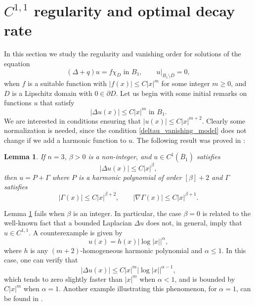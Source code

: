 \documentclass[11pt,a4paper]{amsart}
\newtheorem{Lemma}[Theorem]{Lemma}
\theoremstyle{definition}
\numberwithin{equation}{section}
\newcommand{\abs}[1]{\lvert #1 \rvert}          %
\newcommand{\ol}[1]{\overline{#1}}
\newcommand{\p}{\partial}
\begin{document}
\section{$C^{1,1}$ regularity and optimal decay rate} \label{sec_regularity}

In this section we study the regularity and vanishing order for solutions of the equation 
\begin{equation} \label{regularity_equation_first}
(\Delta + q)u = f \chi_D \text{ in $B_1$}, \qquad u|_{B_1 \setminus \ol{D}} = 0,
\end{equation}
when $f$ is a suitable function with $\abs{f(x)} \leq C\abs{x}^m$ for some integer $m \geq 0$, and $D$ is a Lipschitz domain with $0 \in \p D$. Let us begin with some initial remarks on functions $u$ that satisfy 
\begin{equation} \label{deltau_vanishing_model}
\abs{\Delta u(x)} \leq C \abs{x}^m \text{ in $B_1$}.
\end{equation}
We are interested in conditions ensuring that $\abs{u(x)} \leq C \abs{x}^{m+2}$. Clearly some normalization is needed, since the condition \eqref{deltau_vanishing_model} does not change if we add a harmonic function to $u$. The following result was proved in \cite{CaffarelliFriedman}:

\begin{Lemma} \label{lemma_cf}
If $n=3$, $\beta > 0$ is a non-integer, and $u \in C^1(\ol{B}_1)$ satisfies 
\[
\abs{\Delta u(x)} \leq C \abs{x}^{\beta},
\]
then $u = P + \Gamma$ where $P$ is a harmonic polynomial of order $[\beta]+2$ and $\Gamma$ satisfies 
\[
\abs{\Gamma(x)} \leq C \abs{x}^{\beta+2}, \qquad \abs{\nabla \Gamma(x)} \leq C \abs{x}^{\beta+1}.
\]
\end{Lemma}






Lemma \ref{lemma_cf} fails when $\beta$ is an integer. In particular, the case $\beta = 0$ is related to the well-known fact that a bounded Laplacian $\Delta u$ does not, in general, imply that $u \in C^{1,1}$.  
A counterexample is given by  
\begin{equation} \label{counterexample_coneone} 
u(x) = h(x) | \log |x||^\alpha,
\end{equation}  
where $h$ is any $(m+2)$-homogeneous harmonic polynomial and $\alpha \leq 1$.  
In this case, one can verify that  
\[
|\Delta u(x)| \leq C |x|^m |\log |x||^{\alpha -1},
\]  
which tends to zero slightly faster than $|x|^m$ when $\alpha < 1$, and is bounded by $C|x|^m$ when $\alpha = 1$.  
Another example illustrating this phenomenon, for $\alpha = 1$, can be found in \cite[Exercise 4.9]{GilbargTrudinger}.
\end{document}
